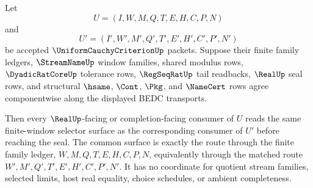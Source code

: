 \begin{theorem}
\label{thm:uniform-cauchy-criterion-finite-window-selector-uniqueness}
Let
$$
U=(I,W,M,Q,T,E,H,C,P,N)
$$
and
$$
U'=(I',W',M',Q',T',E',H',C',P',N')
$$
be accepted $\UniformCauchyCriterionUp$ packets. Suppose their finite family ledgers, $\StreamNameUp$ window families, shared modulus rows, $\DyadicRatCoreUp$ tolerance rows, $\RegSeqRatUp$ tail readbacks, $\RealUp$ seal rows, and structural $\hsame$, $\Cont$, $\Pkg$, and $\NameCert$ rows agree componentwise along the displayed BEDC transports.

Then every $\RealUp$-facing or completion-facing consumer of $U$ reads the same finite-window selector surface as the corresponding consumer of $U'$ before reaching the seal. The common surface is exactly the route through the finite family ledger, $W,M,Q,T,E,H,C,P,N$, equivalently through the matched route $W',M',Q',T',E',H',C',P',N'$. It has no coordinate for quotient stream families, selected limits, host real equality, choice schedules, or ambient completeness.
\end{theorem}
